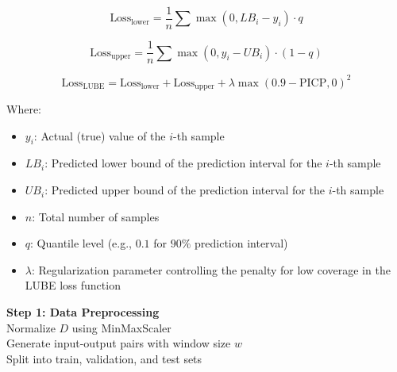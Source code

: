 \begin{itemize}
        \begin{equation}
            \text{Loss}_{\text{lower}} = \frac{1}{n} \sum \max(0, LB_i - y_i) \cdot q
            \label{Loss Lower}
        \end{equation}

        \begin{equation}
            \text{Loss}_{\text{upper}} = \frac{1}{n} \sum \max(0, y_i - UB_i) \cdot (1 - q)
        \label{Loss Upper}
        \end{equation}

        \begin{equation}
        \text{Loss}_{\text{LUBE}} = \text{Loss}_{\text{lower}} + \text{Loss}_{\text{upper}} + \lambda \max(0.9 - \text{PICP}, 0)^2
        \label{Lube Loss}
        \end{equation}

        Where:
        \begin{itemize}
        \item $y_i$: Actual (true) value of the $i$-th sample
        \item $LB_i$: Predicted lower bound of the prediction interval for the $i$-th sample
        \item $UB_i$: Predicted upper bound of the prediction interval for the $i$-th sample
        \item $n$: Total number of samples
        \item $q$: Quantile level (e.g., $0.1$ for $90\%$ prediction interval)
        \item $\lambda$: Regularization parameter controlling the penalty for low coverage in the LUBE loss function
        \end{itemize}
        
        \begin{algorithm}[H]
        \footnotesize
        \SetAlgoCaptionSeparator{:}
        
        
        \textbf{Step 1: Data Preprocessing}\\
        Normalize $D$ using MinMaxScaler\\
        Generate input-output pairs with window size $w$\\
        Split into train, validation, and test sets\\
        

\end{algorithm}
\end{itemize}
